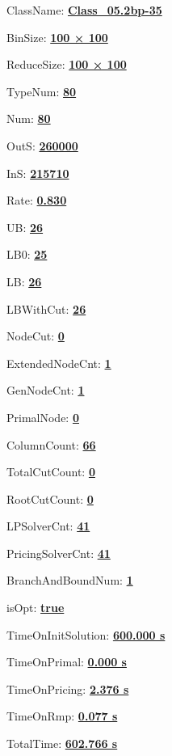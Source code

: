 \documentclass[11pt]{article}
\begin{document}
\pagestyle{empty}


ClassName: \underline{\textbf{Class_05.2bp-35}}
\par
BinSize: \underline{\textbf{100 × 100}}
\par
ReduceSize: \underline{\textbf{100 × 100}}
\par
TypeNum: \underline{\textbf{80}}
\par
Num: \underline{\textbf{80}}
\par
OutS: \underline{\textbf{260000}}
\par
InS: \underline{\textbf{215710}}
\par
Rate: \underline{\textbf{0.830}}
\par
UB: \underline{\textbf{26}}
\par
LB0: \underline{\textbf{25}}
\par
LB: \underline{\textbf{26}}
\par
LBWithCut: \underline{\textbf{26}}
\par
NodeCut: \underline{\textbf{0}}
\par
ExtendedNodeCnt: \underline{\textbf{1}}
\par
GenNodeCnt: \underline{\textbf{1}}
\par
PrimalNode: \underline{\textbf{0}}
\par
ColumnCount: \underline{\textbf{66}}
\par
TotalCutCount: \underline{\textbf{0}}
\par
RootCutCount: \underline{\textbf{0}}
\par
LPSolverCnt: \underline{\textbf{41}}
\par
PricingSolverCnt: \underline{\textbf{41}}
\par
BranchAndBoundNum: \underline{\textbf{1}}
\par
isOpt: \underline{\textbf{true}}
\par
TimeOnInitSolution: \underline{\textbf{600.000 s}}
\par
TimeOnPrimal: \underline{\textbf{0.000 s}}
\par
TimeOnPricing: \underline{\textbf{2.376 s}}
\par
TimeOnRmp: \underline{\textbf{0.077 s}}
\par
TotalTime: \underline{\textbf{602.766 s}}
\par
\newpage


\end{document}

